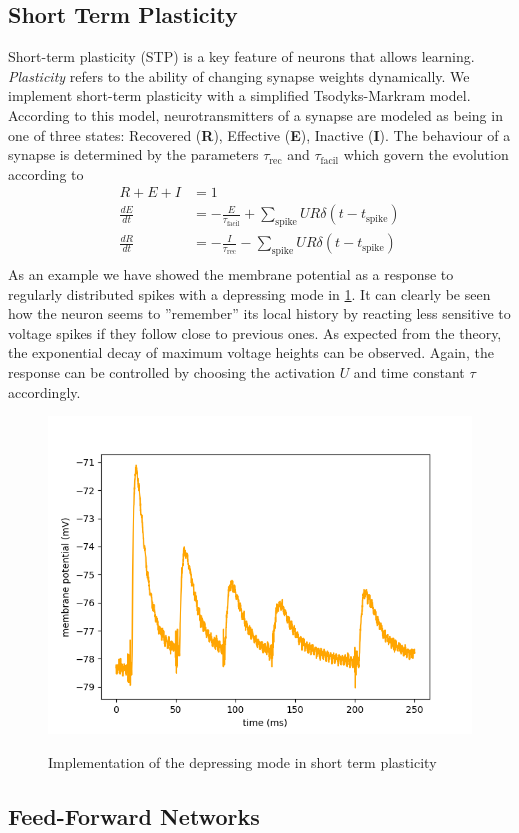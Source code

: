 \documentclass[a4paper,twocolumn]{article}
\begin{document}
\subsection{Short Term Plasticity}
Short-term plasticity (STP) is a key feature of neurons that allows learning.
\textit{Plasticity} refers to the ability of changing synapse weights dynamically.
We implement short-term plasticity with a simplified Tsodyks-Markram model.  According
to this model,  neurotransmitters of a synapse are modeled as being in one of
three states: Recovered (\textbf{R}),  Effective (\textbf{E}),  Inactive
(\textbf{I}).  The behaviour of a synapse is determined by the parameters
$\tau_\text{rec}$ and $\tau_\text{facil}$ which govern the evolution according to
\begin{align*}
	R + E + I &= 1 \\
	\frac{dE}{dt} &= - \frac{E}{\tau_\text{facil}} + \sum_\text{spike} UR\delta(t-t_\text{spike} ) \\
	\frac{dR}{dt} &= - \frac{I}{\tau_\text{rec}} - \sum_\text{spike} UR\delta(t-t_\text{spike} ) \\
\end{align*}
As an example we have showed the membrane potential as a response to regularly 
distributed spikes with a depressing mode in \ref{stp_depress}.  It can clearly be 
seen how the neuron seems to ''remember'' its local history by reacting less sensitive 
to voltage spikes if they follow close to previous ones.  As expected from the theory,  
the exponential decay of maximum voltage heights can be observed.  Again,  the response 
can be controlled by choosing the activation $U$ and time constant $\tau$ accordingly.
\begin{figure}
		\includegraphics[width=.5\textwidth]{figures/stp_depressing.png}
		\label{stp_depress}
		\caption{Implementation of the depressing mode in short term plasticity}
\end{figure}

\subsection{Feed-Forward Networks}
\label{sec:feed-forward}
\end{document}
